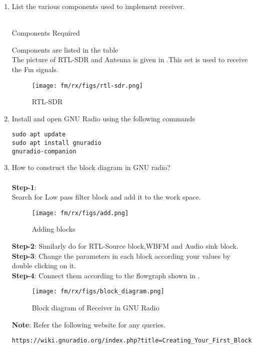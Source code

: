 \begin{enumerate}[label=\arabic*.,ref=\thesection.\theenumi]
\item List the various components used to implement receiver.
\\
\solution
\\
\begin{table}[!ht]
  \centering
  
  \caption{Components Required}
  \label{tab:rxcomponents}
\end{table}
Components are listed in the table \\
The picture of RTL-SDR and Antenna is given in .This set is used to receive the Fm signals.
\begin{figure}[H]
\centering
\texttt{[image: fm/rx/figs/rtl-sdr.png]}
\caption{RTL-SDR}
\label{fig:rtl-sdr}
\end{figure}
\item Install and open GNU Radio using the following commands
\\
\begin{lstlisting}
sudo apt update
sudo apt install gnuradio
gnuradio-companion
\end{lstlisting}
\item How to construct the block diagram in GNU radio? \\
	\solution  \\
\textbf{Step-1}:\\
Search for Low pass filter block and add it to the work space.
\begin{figure}[H]
\centering
\texttt{[image: fm/rx/figs/add.png]}
\caption{Adding blocks}
\label{fig:add blocks}
\end{figure}
\textbf{Step-2}:
Similarly do for RTL-Source block,WBFM and Audio sink block.
\\
\textbf{Step-3}:
Change the parameters in each block according your values by double clicking on it.
\\
\textbf{Step-4}:
Connect them according to the flowgraph shown in .
\begin{figure}[H]
\centering
\texttt{[image: fm/rx/figs/block\_diagram.png]}
\caption{Block diagram of Receiver in GNU Radio}
\label{fig:Block_diagram}
\end{figure}
\textbf{Note}:
Refer the following website for any queries.
\begin{lstlisting}
https://wiki.gnuradio.org/index.php?title=Creating_Your_First_Block

\end{lstlisting}
\end{enumerate}

